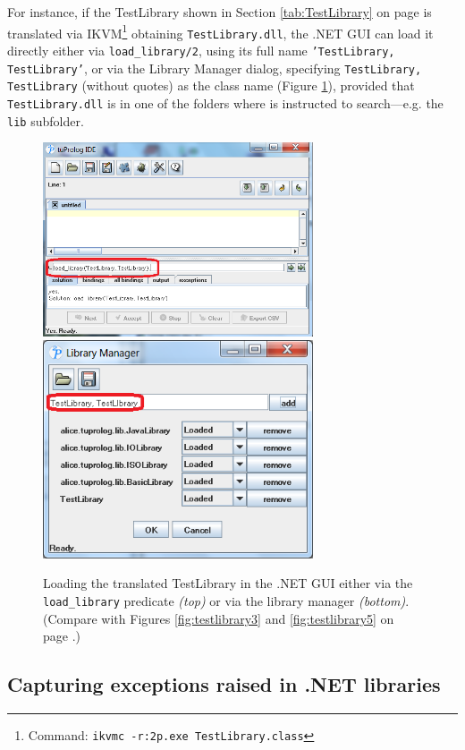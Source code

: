 For instance, if the TestLibrary shown in Section \ref{tab:TestLibrary} on page \pageref{tab:TestLibrary} is translated via IKVM\footnote{Command: \texttt{ikvmc -r:2p.exe TestLibrary.class}} obtaining \texttt{TestLibrary.dll}, the \tuprolog{}.NET GUI can load it directly either via \texttt{load\_library/2}, using its full name \texttt{'TestLibrary, TestLibrary'}, or via the Library Manager dialog, specifying \texttt{TestLibrary, TestLibrary} (without quotes) as the class name (Figure \ref{fig:dotnet-testlibrary}), provided that \texttt{TestLibrary.dll} is in one of the folders where \tuprolog{} is instructed to search---e.g. the \texttt{lib} subfolder.

\begin{figure}
    \centering
  \includegraphics[width=8cm]{images/dotnet-testlibrary1}
  \includegraphics[width=8cm]{images/dotnet-testlibrary2}
  \caption{Loading the translated TestLibrary in the \tuprolog{}.NET GUI either via the \texttt{load\_library} predicate \textit{(top)} or via the library manager \textit{(bottom)}. (Compare with Figures \ref{fig:testlibrary3} and \ref{fig:testlibrary5} on page \pageref{fig:testlibrary5}.)}\label{fig:dotnet-testlibrary}
\end{figure}

\subsection{Capturing exceptions raised in .NET libraries}

